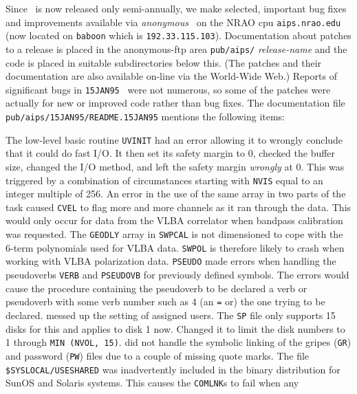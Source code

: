 Since \AIPS\ is now released only semi-annually, we make selected,
important bug fixes and improvements available via {\it anonymous}
\ftp\ on the NRAO cpu {\tt aips.nrao.edu} (now located on {\tt baboon}
which is {\tt 192.33.115.103}).  Documentation about patches to a
release is placed in the anonymous-ftp area {\tt pub/aips/}{\it
release-name} and the code is placed in suitable subdirectories below
this.  (The patches and their documentation are also available on-line
via the World-Wide Web.)  Reports of significant bugs in {\tt 15JAN95}
\AIPS\ were not numerous, so some of the patches were actually for new
or improved code rather than bug fixes.  The documentation file {\tt
pub/aips/15JAN95/README.15JAN95} mentions the following items:
\begin{description}
\vspace{-8pt}
 The low-level basic routine {\tt UVINIT} had an error
   allowing it to wrongly conclude that it could do fast \hbox{I/O}.
   It then set its safety margin to 0, checked the buffer size,
   changed the I/O method, and left the safety margin {\it wrongly} at
   0.  This was triggered by a combination of circumstances starting
   with {\tt NVIS} equal to an integer multiple of 256.
 An error in the use of the same array in two parts of
   the task caused {\tt CVEL} to flag more and more channels as it ran
   through the data.  This would only occur for data from the VLBA
   correlator when bandpass calibration was requested.
 The {\tt GEODLY} array in {\tt SWPCAL} is not
   dimensioned to cope with the 6-term polynomials used for VLBA data.
   {\tt SWPOL} is therefore likely to crash when working with VLBA
   polarization data.
 {\tt PSEUDO} made errors when handling the pseudoverbs
   {\tt VERB} and {\tt PSEUDOVB} for previously defined symbols.  The
   errors would cause the procedure containing the pseudoverb to be
   declared a verb or pseudoverb with some verb number such as 4 (an
   {\tt =} or) the one trying to be declared.
 messed up the setting of assigned users.  The {\tt SP}
   file only supports 15 disks for this and applies to disk 1 now.
   Changed it to limit the disk numbers to 1 through {\tt MIN (NVOL,
   15)}.
 did not handle the symbolic linking of the gripes
   ({\tt GR}) and password ({\tt PW}) files due to a couple of missing
   quote marks.
 The file {\tt \$SYSLOCAL/USESHARED} was
   inadvertently included in the binary distribution for SunOS and
   Solaris systems.  This causes the {\tt COMLNK}s to fail when any

\end{description}

